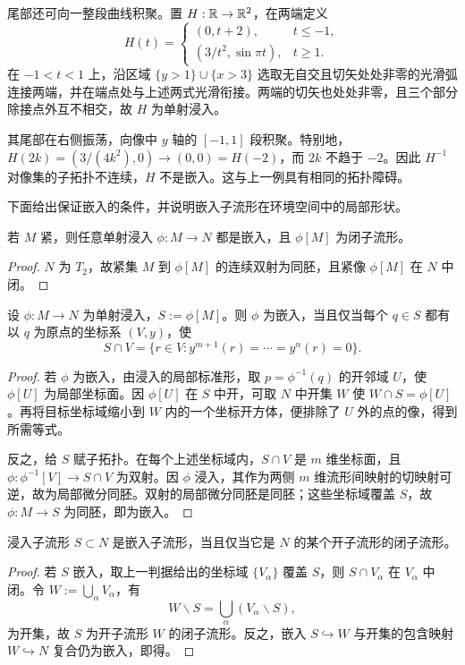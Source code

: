 \begin{example}\label{chdm:exm_iec3}
    尾部还可向一整段曲线积聚。置 $H:\mathbb{R}\to\mathbb{R}^2$，在两端定义
    \[
        H(t)=\begin{cases}
            (0,t+2),&t\leqslant-1,\\
            (3/t^2,\sin\pi t),&t\geqslant1.
        \end{cases}
    \]
    在 $-1<t<1$ 上，沿区域 $\{y>1\}\cup\{x>3\}$ 选取无自交且切矢处处非零的光滑弧连接两端，并在端点处与上述两式光滑衔接。两端的切矢也处处非零，且三个部分除接点外互不相交，故 $H$ 为单射浸入。

    其尾部在右侧振荡，向像中 $y$ 轴的 $[-1,1]$ 段积聚。特别地，$H(2k)=(3/(4k^2),0)\to(0,0)=H(-2)$，而 $2k$ 不趋于 $-2$。因此 $H^{-1}$ 对像集的子拓扑不连续，$H$ 不是嵌入。这与上一例具有相同的拓扑障碍。
\end{example}

下面给出保证嵌入的条件，并说明嵌入子流形在环境空间中的局部形状。
\begin{theorem}
    若 $M$ 紧，则任意单射浸入 $\phi:M\to N$ 都是嵌入，且 $\phi[M]$ 为闭子流形。
\end{theorem}
\begin{proof}
    $N$ 为 $T_2$，故紧集 $M$ 到 $\phi[M]$ 的连续双射为同胚，且紧像 $\phi[M]$ 在 $N$ 中闭。
\end{proof}

\begin{theorem}[局部坐标面判据]\label{chdm:thm_embed-3}
    设 $\phi:M\to N$ 为单射浸入，$S:=\phi[M]$。则 $\phi$ 为嵌入，当且仅当每个 $q\in S$ 都有以 $q$ 为原点的坐标系 $(V,y)$，使
    \[
        S\cap V=\{r\in V:y^{m+1}(r)=\cdots=y^n(r)=0\}.
    \]
\end{theorem}
\begin{proof}
    若 $\phi$ 为嵌入，由浸入的局部标准形，取 $p=\phi^{-1}(q)$ 的开邻域 $U$，使 $\phi[U]$ 为局部坐标面。因 $\phi[U]$ 在 $S$ 中开，可取 $N$ 中开集 $W$ 使 $W\cap S=\phi[U]$。再将目标坐标域缩小到 $W$ 内的一个坐标开方体，便排除了 $U$ 外的点的像，得到所需等式。

    反之，给 $S$ 赋子拓扑。在每个上述坐标域内，$S\cap V$ 是 $m$ 维坐标面，且 $\phi:\phi^{-1}[V]\to S\cap V$ 为双射。因 $\phi$ 浸入，其作为两侧 $m$ 维流形间映射的切映射可逆，故为局部微分同胚。双射的局部微分同胚是同胚；这些坐标域覆盖 $S$，故 $\phi:M\to S$ 为同胚，即为嵌入。
\end{proof}

\begin{theorem}
    浸入子流形 $S\subset N$ 是嵌入子流形，当且仅当它是 $N$ 的某个开子流形的闭子流形。
\end{theorem}
\begin{proof}
    若 $S$ 嵌入，取上一判据给出的坐标域 $\{V_\alpha\}$ 覆盖 $S$，则 $S\cap V_\alpha$ 在 $V_\alpha$ 中闭。令 $W:=\bigcup_\alpha V_\alpha$，有
    \[
        W\backslash S=\bigcup_\alpha(V_\alpha\backslash S),
    \]
    为开集，故 $S$ 为开子流形 $W$ 的闭子流形。反之，嵌入 $S\hookrightarrow W$ 与开集的包含映射 $W\hookrightarrow N$ 复合仍为嵌入，即得。
\end{proof}

